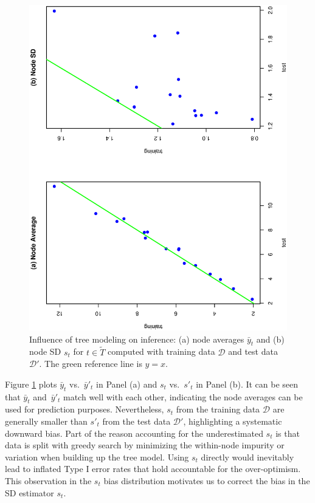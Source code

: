 \begin{figure}[H]
	\centering
	\includegraphics[scale=0.35, angle=270]{fig-inf.eps}
	\caption{Influence of tree modeling on inference: (a) node averages $\bar{y}_t$ and (b) node SD $s_t$ for $t \in \widetilde{T}$ computed with training data $\mathcal{D}$ and test data $\mathcal{D}'$. The green reference line is $y=x$. 
		\label{fig-inf-influence}}
\end{figure}
Figure \ref{fig-inf-influence} plots $\bar{y}_t$ vs.~$\bar{y}'_t$ in Panel (a) and $s_t$ vs.~$s'_t$ in Panel (b). It can be seen that $\bar{y}_t$ and~$\bar{y}'_t$ match well with each other, indicating the node averages can be used for prediction purposes. Nevertheless, $s_t$ from the training data $\mathcal{D}$ are generally smaller than $s'_t$ from the test data $\mathcal{D}'$, highlighting a systematic downward bias. Part of the reason accounting for the underestimated $s_t$ is that data is split with greedy search by minimizing the within-node impurity or variation when building up the tree model. Using $s_t$ directly would inevitably lead to inflated Type I error rates that hold accountable for the over-optimism. This observation in the $s_t$ bias distribution motivates us to correct the bias in the SD estimator $s_t$. 

